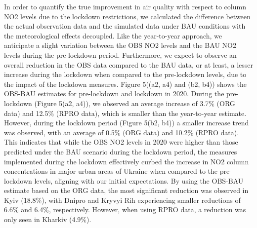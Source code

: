 In order to quantify the true improvement in air quality with respect to column NO2 levels due to the lockdown restrictions, we calculated the difference between the actual observation data and the simulated data under BAU conditions with the meteorological effects decoupled. Like the year-to-year approach, we anticipate a slight variation between the OBS NO2 levels and the BAU NO2 levels during the pre-lockdown period. Furthermore, we expect to observe an overall reduction in the OBS data compared to the BAU data, or at least, a lesser increase during the lockdown when compared to the pre-lockdown levels, due to the impact of the lockdown measures. Figure 5((a2, a4) and (b2, b4)) shows the OBS-BAU estimates for pre-lockdown and lockdown in 2020. During the pre-lockdown (Figure 5(a2, a4)), we observed an average increase of 3.7\% (ORG data) and 12.5\% (RPRO data), which is smaller than the year-to-year estimate. However, during the lockdown period (Figure 5(b2, b4)) a smaller increase trend was observed, with an average of 0.5\% (ORG data) and 10.2\% (RPRO data). This indicates that while the OBS NO2 levels in 2020 were higher than those predicted under the BAU scenario during the lockdown period, the measures implemented during the lockdown effectively curbed the increase in NO2 column concentrations in major urban areas of Ukraine when compared to the pre-lockdown levels, aligning with our initial expectations. By using the OBS-BAU estimate based on the ORG data, the most significant reduction was observed in Kyiv (18.8\%), with Dnipro and Kryvyi Rih experiencing smaller reductions of 6.6\% and 6.4\%, respectively. However, when using RPRO data, a reduction was only seen in Kharkiv (4.9\%).\par

